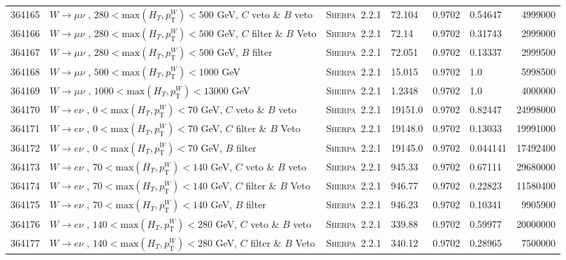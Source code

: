 \begin{table}[!htb]
{\begin{tabular}{llllllr}
      364165 & $W \to \mu\nu $ , $280<\text{max}(H_T,p_{\text{T}}^W)<500$ GeV, $C$ veto \& $B$ veto & \textsc{Sherpa}~2.2.1 &   72.104         & 0.9702& 0.54647 &  4999000 \\
      364166 & $W \to \mu\nu $ , $280<\text{max}(H_T,p_{\text{T}}^W)<500$ GeV,  $C$ filter \& $B$ Veto & \textsc{Sherpa}~2.2.1 &72.14          & 0.9702& 0.31743 &  2999000 \\
      364167 & $W \to \mu\nu $ , $280<\text{max}(H_T,p_{\text{T}}^W)<500$ GeV, $B$ filter & \textsc{Sherpa}~2.2.1 &             72.051         & 0.9702& 0.13337 &  2999500 \\
      364168 & $W \to \mu\nu $ , $500<\text{max}(H_T,p_{\text{T}}^W)<1000$ GeV                      & \textsc{Sherpa}~2.2.1 &   15.015         & 0.9702& 1.0 	&  5998500 \\
      364169 & $W \to \mu\nu $ , $1000<\text{max}(H_T,p_{\text{T}}^W)<13000$ GeV                       & \textsc{Sherpa}~2.2.1 &1.2348         & 0.9702& 1.0     &  4000000 \\
      364170 & $W \to e\nu $ , $0<\text{max}(H_T,p_{\text{T}}^W)<70$ GeV, $C$ veto \& $B$ veto & \textsc{Sherpa}~2.2.1 &        19151.0        & 0.9702& 0.82447 &  24998000\\
      364171 & $W \to e\nu $ , $0<\text{max}(H_T,p_{\text{T}}^W)<70$ GeV,  $C$ filter \& $B$ Veto & \textsc{Sherpa}~2.2.1 &     19148.0        & 0.9702& 0.13033 &  19991000\\
      364172 & $W \to e\nu $ , $0<\text{max}(H_T,p_{\text{T}}^W)<70$ GeV, $B$ filter & \textsc{Sherpa}~2.2.1 &                  19145.0        & 0.9702& 0.044141&  17492400\\
      364173 & $W \to e\nu $ , $70<\text{max}(H_T,p_{\text{T}}^W)<140$ GeV, $C$ veto \& $B$ veto & \textsc{Sherpa}~2.2.1 &      945.33         & 0.9702& 0.67111 &  29680000\\
      364174 & $W \to e\nu $ , $70<\text{max}(H_T,p_{\text{T}}^W)<140$ GeV,  $C$ filter \& $B$ Veto & \textsc{Sherpa}~2.2.1 &   946.77         & 0.9702& 0.22823 &  11580400\\
      364175 & $W \to e\nu $ , $70<\text{max}(H_T,p_{\text{T}}^W)<140$ GeV, $B$ filter & \textsc{Sherpa}~2.2.1 &                946.23         & 0.9702& 0.10341 &  9905900 \\
      364176 & $W \to e\nu $ , $140<\text{max}(H_T,p_{\text{T}}^W)<280$ GeV, $C$ veto \& $B$ veto & \textsc{Sherpa}~2.2.1 &     339.88         & 0.9702& 0.59977 &  20000000\\
      364177 & $W \to e\nu $ , $140<\text{max}(H_T,p_{\text{T}}^W)<280$ GeV,  $C$ filter \& $B$ Veto & \textsc{Sherpa}~2.2.1 &  340.12         & 0.9702& 0.28965 &  7500000 \\

\end{tabular}}
\end{table}
